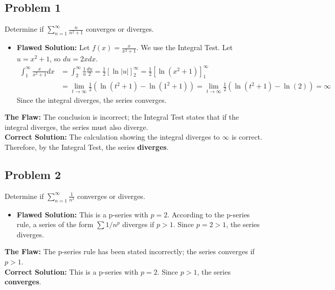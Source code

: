 \documentclass{article}
\begin{document}
\subsection*{Problem 1}
Determine if $\sum_{n=1}^\infty \frac{n}{n^2+1}$ converges or diverges.
\begin{itemize}
    \item \textbf{Flawed Solution:} Let $f(x) = \frac{x}{x^2+1}$. We use the Integral Test. Let $u = x^2+1$, so $du = 2x dx$.
    \begin{align*}
        \int_1^\infty \frac{x}{x^2+1} dx &= \int_2^\infty \frac{1}{u} \frac{du}{2} = \frac{1}{2} [\ln|u|]_2^\infty = \frac{1}{2} [\ln(x^2+1)]_1^\infty \\
        &= \lim_{t\to\infty} \frac{1}{2} (\ln(t^2+1) - \ln(1^2+1)) = \lim_{t\to\infty} \frac{1}{2} (\ln(t^2+1) - \ln(2)) = \infty
    \end{align*}
    Since the integral diverges, the series converges.
\end{itemize}
\textbf{The Flaw:} The conclusion is incorrect; the Integral Test states that if the integral diverges, the series must also diverge. \\
\textbf{Correct Solution:} The calculation showing the integral diverges to $\infty$ is correct. Therefore, by the Integral Test, the series \textbf{diverges}.

\subsection*{Problem 2}
Determine if $\sum_{n=1}^\infty \frac{1}{n^2}$ converges or diverges.
\begin{itemize}
    \item \textbf{Flawed Solution:} This is a p-series with $p=2$. According to the p-series rule, a series of the form $\sum 1/n^p$ diverges if $p>1$. Since $p=2>1$, the series diverges.
\end{itemize}
\textbf{The Flaw:} The p-series rule has been stated incorrectly; the series converges if $p>1$. \\
\textbf{Correct Solution:} This is a p-series with $p=2$. Since $p>1$, the series \textbf{converges}.
\end{document}
